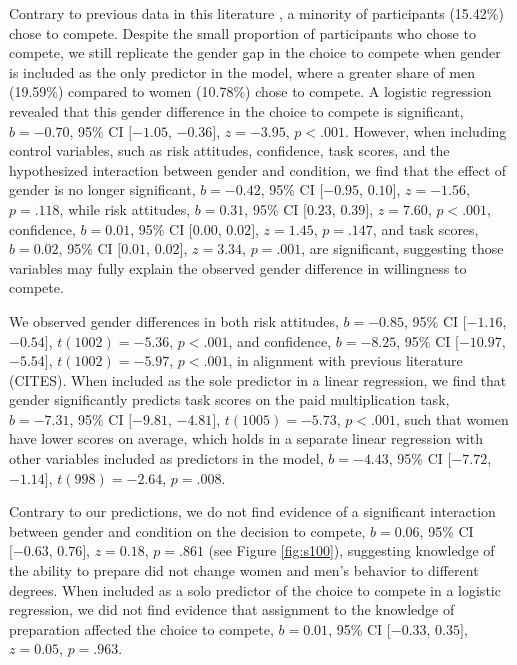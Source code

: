\documentclass[a4paper,nobind]{templates/ociamthesis}
\begin{document}
Contrary to previous data in this literature \autocite{Niederle2007}, a minority of participants (15.42\%) chose to compete. Despite the small proportion of participants who chose to compete, we still replicate the gender gap in the choice to compete when gender is included as the only predictor in the model, where a greater share of men (19.59\%) compared to women (10.78\%) chose to compete. A logistic regression revealed that this gender difference in the choice to compete is significant, \(b = -0.70\), 95\% CI \([-1.05\), \(-0.36]\), \(z = -3.95\), \(p < .001\). However, when including control variables, such as risk attitudes, confidence, task scores, and the hypothesized interaction between gender and condition, we find that the effect of gender is no longer significant, \(b = -0.42\), 95\% CI \([-0.95\), \(0.10]\), \(z = -1.56\), \(p = .118\), while risk attitudes, \(b = 0.31\), 95\% CI \([0.23\), \(0.39]\), \(z = 7.60\), \(p < .001\), confidence, \(b = 0.01\), 95\% CI \([0.00\), \(0.02]\), \(z = 1.45\), \(p = .147\), and task scores, \(b = 0.02\), 95\% CI \([0.01\), \(0.02]\), \(z = 3.34\), \(p = .001\), are significant, suggesting those variables may fully explain the observed gender difference in willingness to compete.

We observed gender differences in both risk attitudes, \(b = -0.85\), 95\% CI \([-1.16\), \(-0.54]\), \(t(1002) = -5.36\), \(p < .001\), and confidence, \(b = -8.25\), 95\% CI \([-10.97\), \(-5.54]\), \(t(1002) = -5.97\), \(p < .001\), in alignment with previous literature (CITES). When included as the sole predictor in a linear regression, we find that gender significantly predicts task scores on the paid multiplication task, \(b = -7.31\), 95\% CI \([-9.81\), \(-4.81]\), \(t(1005) = -5.73\), \(p < .001\), such that women have lower scores on average, which holds in a separate linear regression with other variables included as predictors in the model, \(b = -4.43\), 95\% CI \([-7.72\), \(-1.14]\), \(t(998) = -2.64\), \(p = .008\).

Contrary to our predictions, we do not find evidence of a significant interaction between gender and condition on the decision to compete, \(b = 0.06\), 95\% CI \([-0.63\), \(0.76]\), \(z = 0.18\), \(p = .861\) (see Figure \ref{fig:s100}), suggesting knowledge of the ability to prepare did not change women and men's behavior to different degrees. When included as a solo predictor of the choice to compete in a logistic regression, we did not find evidence that assignment to the knowledge of preparation affected the choice to compete, \(b = 0.01\), 95\% CI \([-0.33\), \(0.35]\), \(z = 0.05\), \(p = .963\).
\end{document}
